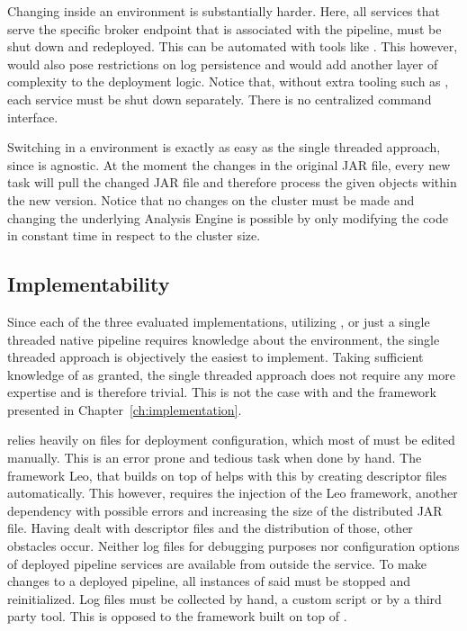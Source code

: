Changing \anens{} inside an \uimaas{} environment is substantially harder. Here, all services that serve the specific broker endpoint that is associated with the pipeline, must be shut down and redeployed. This can be automated with tools like \docker{}. This however, would also pose restrictions on log persistence and would add another layer of complexity to the deployment logic. Notice that, without extra tooling such as \docker{}, each service must be shut down separately. There is no centralized command interface.

Switching \anens{} in a \spark{} environment is exactly as easy as the single threaded approach, since \spark{} is \uima{} agnostic. At the moment the \anen{} changes in the original JAR file, every new task \spark{} will pull the changed JAR file and therefore process the given \cas{} objects within the new \anen{} version. Notice that no changes on the cluster must be made and changing the underlying Analysis Engine is possible by only modifying the code in constant time in respect to the cluster size.
\subsection{Implementability}
Since each of the three evaluated implementations, utilizing \spark{}, \uimaas{} or just a single threaded native \uima{} pipeline requires knowledge about the \uima{} environment, the single threaded approach is objectively the easiest to implement. Taking sufficient knowledge of \uima{} as granted, the single threaded approach does not require any more expertise and is therefore trivial. This is not the case with \uimaas{} and the framework presented in Chapter~\ref{ch:implementation}.

\uimaas{} relies heavily on \xml{} files for deployment configuration, which most of must be edited manually. This is an error prone and tedious task when done by hand. The framework Leo, that builds on top of \uimaas{} helps with this by creating \xml{} descriptor files automatically. This however, requires the injection of the Leo framework, another dependency with possible errors and increasing the size of the distributed JAR file. Having dealt with \xml{} descriptor files and the distribution of those, other obstacles occur. Neither log files for debugging purposes nor configuration options of deployed pipeline services are available from outside the service. To make changes to a deployed pipeline, all instances of said \anen{} must be stopped and reinitialized. Log files must be collected by hand, a custom script or by a third party tool. This is opposed to the framework built on top of \spark{}.

